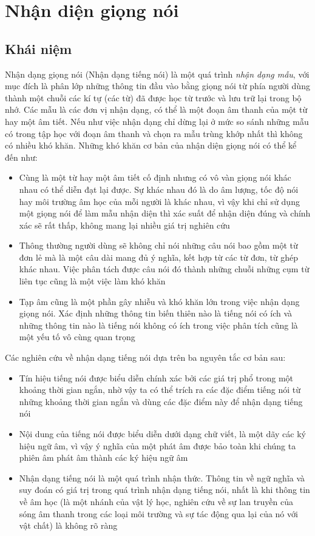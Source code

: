 \documentclass[12pt]{report}
\begin{document}
\section{Nhận diện giọng nói}
\subsection{Khái niệm}
Nhận dạng giọng nói (Nhận dạng tiếng nói) là một quá trình \textit{nhận dạng mẫu}, với mục đích là phân lớp những thông tin đầu vào bằng giọng nói từ phía người dùng thành một chuỗi các kí tự (các từ) đã được học từ trước và lưu trữ lại trong bộ nhớ. Các mẫu là các đơn vị nhận dạng, có thể là một đoạn âm thanh của một từ hay một âm tiết. Nếu như việc nhận dạng chỉ dừng lại ở mức so sánh những mẫu có trong tập học với đoạn âm thanh và chọn ra mẫu trùng khớp nhất thì không có nhiều khó khăn. Những khó khăn cơ bản của nhận diện giọng nói có thể kể đến như:

\begin{itemize}
	\item Cùng là một từ hay một âm tiết cố định nhưng có vô vàn giọng nói khác nhau có thể diễn đạt lại được. Sự khác nhau đó là do âm lượng, tốc độ nói hay môi trường âm học của mỗi người là khác nhau, vì vậy khi chỉ sử dụng một giọng nói để làm mẫu nhận diện thì xác suất để nhận diện đúng và chính xác sẽ rất thấp, không mang lại nhiều giá trị nghiên cứu
	\item Thông thường người dùng sẽ không chỉ nói những câu nói bao gồm một từ đơn lẻ mà là một câu dài mang đủ ý nghĩa, kết hợp từ các từ đơn, từ ghép khác nhau. Việc phân tách được câu nói đó thành những chuỗi những cụm từ liên tục cũng là một việc làm khó khăn
	\item Tạp âm cũng là một phần gây nhiễu và khó khăn lớn trong việc nhận dạng giọng nói. Xác định những thông tin biến thiên nào là tiếng nói có ích và những thông tin nào là tiếng nói không có ích trong việc phân tích cũng là một yếu tố vô cùng quan trọng
\end{itemize}

\noindent Các nghiên cứu về nhận dạng tiếng nói dựa trên ba nguyên tắc cơ bản sau:
\begin{itemize}
	\item Tín hiệu tiếng nói được biểu diễn chính xác bởi các giá trị phổ trong một khoảng thời gian ngắn, nhờ vậy ta có thể trích ra các đặc điểm tiếng nói từ những khoảng thời gian ngắn và dùng các đặc điểm này để nhận dạng tiếng nói
	\item Nội dung của tiếng nói được biểu diễn dưới dạng chữ viết, là một dãy các ký hiệu ngữ âm, vì vậy ý nghĩa của một phát âm được bảo toàn khi chúng ta phiên âm phát âm thành các ký hiệu ngữ âm
	\item Nhận dạng tiếng nói là một quá trình nhận thức. Thông tin về ngữ nghĩa và suy đoán có giá trị trong quá trình nhận dạng tiếng nói, nhất là khi thông tin về âm học (là một nhánh của vật lý học, nghiên cứu về sự lan truyền của sóng âm thanh trong các loại môi trường và sự tác động qua lại của nó với vật chất) là không rõ ràng
\end{itemize}
\end{document}
